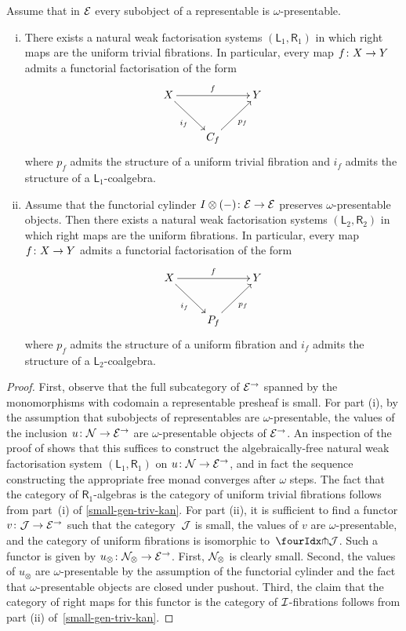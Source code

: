 \documentclass[reqno,10pt,a4paper,oneside,draft]{amsart}
\begin{document}
\begin{theorem} \label{thm:sset-cset-nwfs} Assume that in $\cal{E}$ every subobject of a representable is $\omega$-presentable.
\begin{enumerate}[(i)] 
\item There exists a natural weak factorisation systems $(\mathsf{L}_1, \mathsf{R}_1)$  in which right maps are the uniform trivial fibrations. In particular, every map $f \co X \to Y$ admits a functorial factorisation of the form
\[
\xymatrix{
  X \ar[rr]^f \ar[dr]_{i_f} & & Y \\
  & C_f \ar[ur]_{p_f}
}
\]
where $p_f$ admits the structure of a uniform trivial fibration and $i_f$ admits the structure of a $\mathsf{L}_1$-coalgebra.
\item Assume that the functorial cylinder $\interval \otimes (-) \co \cal{E} \to \cal{E}$ preserves $\omega$-presentable objects. 
Then there exists a natural weak factorisation systems $(\mathsf{L}_2, \mathsf{R}_2)$  in which right maps are the uniform fibrations. In particular, every map $f \co X \to Y$ admits a functorial factorisation of the form
\[
\xymatrix{
X \ar[rr]^f \ar[dr]_{i_f} & & Y \\
 & P_f \ar[ur]_{p_f} }
 \]
where $p_f$ admits the structure of a uniform fibration and $i_f$ admits the structure of a $\mathsf{L}_2$-coalgebra.
\end{enumerate}
\end{theorem}

\begin{proof}
First, observe that the full subcategory of $\catE^\to$ spanned by the monomorphisms with codomain a representable presheaf is small.
For part (i), by the assumption that subobjects of representables are $\omega$-presentable, the values of the inclusion $u \co \cal{N} \to \cal{E}^\to$
are $\omega$-presentable objects of $\cal{E}^\to$. An inspection of the proof of \cite[Proposition 4.22]{garner:small-object-argument}
shows that this suffices to construct the algebraically-free natural weak factorisation system $(\mathsf{L}_1, \mathsf{R}_1)$ 
on $u \co \cal{N} \to \cal{E}^\to$, and in fact the sequence constructing the appropriate free monad converges after $\omega$ steps. 
The fact that the category of $\mathsf{R}_1$-algebras is the category of uniform trivial fibrations follows from part~(i) of \cref{small-gen-triv-kan}.
For part (ii), it is sufficient to find a functor $v \co \cal{J} \rightarrow \catE^\to$ such that the category~$\cal{J}$ is small, the values of $v$ are
$\omega$-presentable, and  the category of uniform fibrations is isomorphic to~$\liftr{\cal{J}}$. Such a functor is given by  $u_\otimes \co \cal{N}_\otimes \rightarrow \catE^\to$. First, $\cal{N}_\otimes$ is clearly small. Second, the values of $u_\otimes$ are $\omega$-presentable by the assumption of the functorial cylinder and the fact that
$\omega$-presentable objects are closed under pushout. Third, the claim that the category of right maps for this functor is the category of $\cal{I}$-fibrations
follows from part (ii) of~\cref{small-gen-triv-kan}.
\end{proof}
\end{document}

